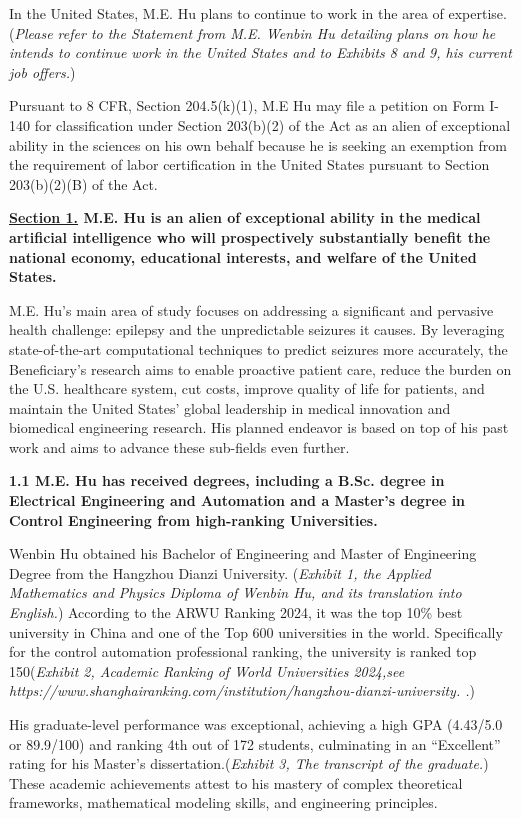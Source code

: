 \documentclass{article}
\begin{document}
In the United States, M.E. Hu plans to continue to work in the area of expertise. ({\it Please refer to the Statement from M.E. Wenbin Hu detailing plans on how he intends to continue work in the United States and to Exhibits 8 and 9, his current job offers.})

Pursuant to 8 CFR, Section 204.5(k)(1), M.E Hu may file a petition on Form I-140 for classification under Section 203(b)(2) of the Act as an alien of exceptional ability in the sciences on his own behalf because he is seeking an exemption from the requirement of labor certification in the United States pursuant to Section 203(b)(2)(B) of the Act.

\clearpage

{\bf \underline{Section 1.} M.E. Hu is an alien of exceptional ability in the medical artificial intelligence who will prospectively substantially benefit the national economy, educational interests, and welfare of the United States.}

M.E. Hu's main area of study focuses on addressing a significant and pervasive health challenge: epilepsy and the unpredictable seizures it causes. By leveraging state-of-the-art computational techniques to predict seizures more accurately, the Beneficiary’s research aims to enable proactive patient care, reduce the burden on the U.S. healthcare system, cut costs, improve quality of life for patients, and maintain the United States’ global leadership in medical innovation and biomedical engineering research. His planned endeavor is based on top of his past work and aims to advance these sub-fields even further.

 
{\bf 1.1 M.E. Hu has received degrees, including a B.Sc. degree in Electrical Engineering and Automation and a Master’s degree in Control Engineering  from high-ranking Universities. }


Wenbin Hu obtained his Bachelor of Engineering and Master of Engineering Degree from the Hangzhou Dianzi University. ({\it Exhibit 1, the Applied Mathematics and Physics Diploma of Wenbin Hu, and its translation into English.}) According to the ARWU Ranking 2024, it was the top 10\%  best university in China and one of the Top 600 universities in the world. Specifically for the control automation professional ranking, the university is ranked top 150({\it Exhibit 2, Academic Ranking of World Universities 2024,see https://www.shanghairanking.com/institution/hangzhou-dianzi-university. .}) 

His graduate-level performance was exceptional, achieving a high GPA (4.43/5.0 or 89.9/100) and ranking 4th out of 172 students, culminating in an “Excellent” rating for his Master’s dissertation.({\it Exhibit 3, The transcript of the graduate.}) These academic achievements attest to his mastery of complex theoretical frameworks, mathematical modeling skills, and engineering principles.
\end{document}
